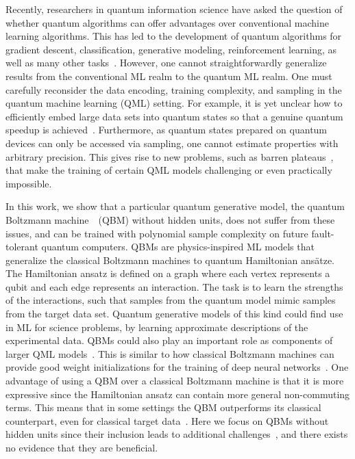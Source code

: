 \documentclass[
    reprint,
    aps,
    prx,
    longbibliography
]{revtex4-2}
\begin{document}
Recently, researchers in quantum information science have asked the question of whether quantum algorithms can offer advantages over conventional machine learning algorithms. This has led to the development of quantum algorithms for gradient descent, classification, generative modeling, reinforcement learning, as well as many other tasks~\cite{Dunjko_2018, Ciliberto_2018, Benedetti_2019, Lamata_2020, Cerezo_2022}. However, one cannot straightforwardly generalize results from the conventional ML realm to the quantum ML realm. One must carefully reconsider the data encoding, training complexity, and sampling in the quantum machine learning (QML) setting. For example, it is yet unclear how to efficiently embed large data sets into quantum states so that a genuine quantum speedup is achieved~\cite{Aaronson_2015, Hoefler_2023}. Furthermore, as quantum states prepared on quantum devices can only be accessed via sampling, one cannot estimate properties with arbitrary precision. This gives rise to new problems, such as barren plateaus~\cite{McClean_2018, Grant2019initialization, Cerezo_2021, Marrero_2021, CerveroMartin2023, rudolph2023trainability}, that make the training of certain QML models challenging or even practically impossible.

In this work, we show that a particular quantum generative model, the quantum Boltzmann machine~\cite{Amin_2018, Benedetti_2017, Kieferova_2017, Kappen_2020}~(QBM) without hidden units, does not suffer from these issues, and can be trained with polynomial sample complexity on future fault-tolerant quantum computers. QBMs are physics-inspired ML models that generalize the classical Boltzmann machines to quantum Hamiltonian ans{\"a}tze. The Hamiltonian ansatz is defined on a graph where each vertex represents a qubit and each edge represents an interaction. The task is to learn the strengths of the interactions, such that samples from the quantum model mimic samples from the target data set. Quantum generative models of this kind could find use in ML for science problems, by learning approximate descriptions of the experimental data. QBMs could also play an important role as components of larger QML models~\cite{Benedetti_2018, Khoshaman_2019, Crawford_2019, Wilson_2021, Wang_2021}. This is similar to how classical Boltzmann machines can provide good weight initializations for the training of deep neural networks~\cite{Hinton_2006}. One advantage of using a QBM over a classical Boltzmann machine is that it is more expressive since the Hamiltonian ansatz can contain more general non-commuting terms. This means that in some settings the QBM outperforms its classical counterpart, even for classical target data~\cite{Kappen_2020}. Here we focus on QBMs without hidden units since their inclusion leads to additional challenges~\cite{Wiebe_2019, Kieferova_2021, Marrero_2021}, and there exists no evidence that they are beneficial.
\end{document}

